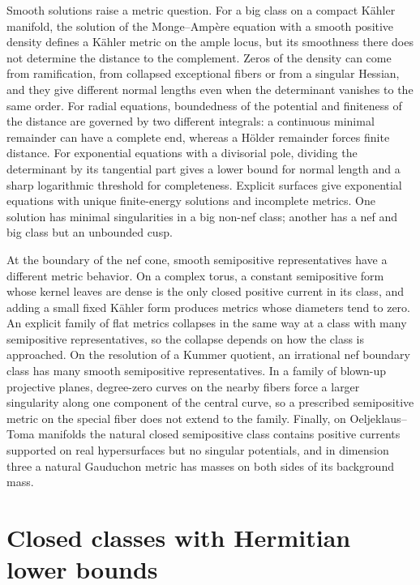Smooth solutions raise a metric question. For a big class on a compact K\"ahler manifold, the solution of the Monge--Amp\`ere equation with a smooth positive density defines a K\"ahler metric on the ample locus, but its smoothness there does not determine the distance to the complement. Zeros of the density can come from ramification, from collapsed exceptional fibers or from a singular Hessian, and they give different normal lengths even when the determinant vanishes to the same order. For radial equations, boundedness of the potential and finiteness of the distance are governed by two different integrals: a continuous minimal remainder can have a complete end, whereas a H\"older remainder forces finite distance. For exponential equations with a divisorial pole, dividing the determinant by its tangential part gives a lower bound for normal length and a sharp logarithmic threshold for completeness. Explicit surfaces give exponential equations with unique finite-energy solutions and incomplete metrics. One solution has minimal singularities in a big non-nef class; another has a nef and big class but an unbounded cusp.

At the boundary of the nef cone, smooth semipositive representatives have a different metric behavior. On a complex torus, a constant semipositive form whose kernel leaves are dense is the only closed positive current in its class, and adding a small fixed K\"ahler form produces metrics whose diameters tend to zero. An explicit family of flat metrics collapses in the same way at a class with many semipositive representatives, so the collapse depends on how the class is approached. On the resolution of a Kummer quotient, an irrational nef boundary class has many smooth semipositive representatives. In a family of blown-up projective planes, degree-zero curves on the nearby fibers force a larger singularity along one component of the central curve, so a prescribed semipositive metric on the special fiber does not extend to the family. Finally, on Oeljeklaus--Toma manifolds the natural closed semipositive class contains positive currents supported on real hypersurfaces but no singular potentials, and in dimension three a natural Gauduchon metric has masses on both sides of its background mass.

\section{Closed classes with Hermitian lower bounds}\label{sec:bc-hermitian-bounds}\label{def:bc-class-positivity}

